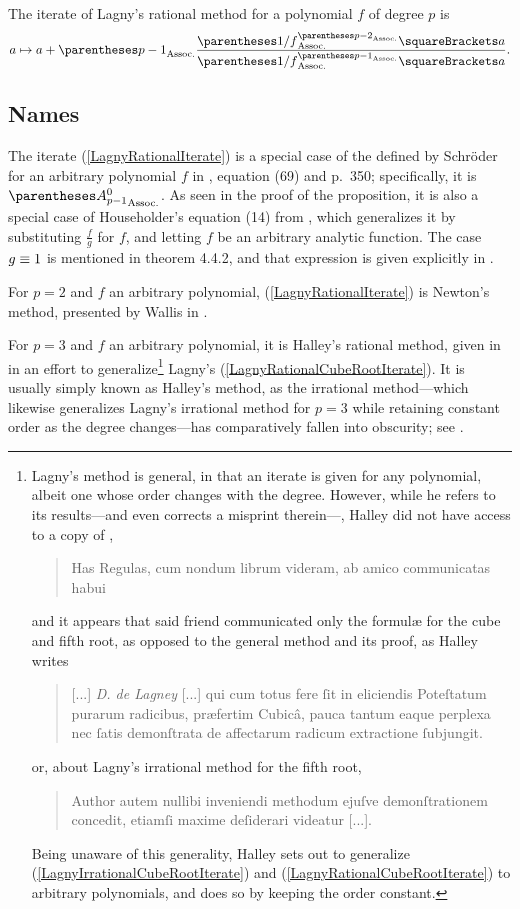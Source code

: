 ﻿\documentclass[10pt, a4paper, twoside]{basestyle}
\begin{document}
\begin{proposition}
The iterate of Lagny’s rational method for a polynomial $f$ of degree $p$ is\begin{equation}
a\mapsto a + \pa{p-1}\frac{\pa{1/f}^{\pa{p-2}}\of{a}}{\pa{1/f}^{\pa{p-1}}\of{a}}\text.\label{LagnyRationalIterate}
\end{equation}
\end{proposition}

\subsection*{Names}
The iterate (\ref{LagnyRationalIterate}) is a special case of the  defined by Schröder for an
arbitrary polynomial $f$ in \cite{Schröder1870}, equation (69) and p.~350; specifically, it is $\pa{A^0_{p-1}}$.
As seen in the proof of the proposition, it is also a special case of Householder’s  equation (14) from \cite[169]{Householder1970},
which generalizes it by substituting $\frac{f}{g}$ for $f$, and letting $f$ be an arbitrary analytic function. The case
$g\equiv1$ is mentioned in theorem 4.4.2, and that expression is given explicitly in \cite{SebahGourdon2001}.

For $p=2$ and $f$ an arbitrary polynomial, (\ref{LagnyRationalIterate}) is Newton's method, presented by Wallis in
\cite[338]{Wallis1685}.

For $p=3$ and $f$ an arbitrary polynomial, it is Halley's rational method, given in \cite[142--143]{Halley1694} in
an effort to generalize\footnote{Lagny's method is general, in that an iterate is given for any
polynomial, albeit one whose order changes with the degree. However, while he refers to its
results---and even corrects a misprint therein---, Halley
did not have access to a copy of \cite{FantetdeLagny1692},
\begin{quote}
Has Regulas, cum nondum librum videram, ab amico communicatas habui
\end{quote}
and it appears that said friend communicated only the formulæ for the cube and fifth root, as opposed to the
general method and its proof, as Halley writes
\begin{quote}
[...] \emph{D. de Lagney} [...] qui cum totus fere ſit in eliciendis Poteſtatum purarum radicibus,
præfertim Cubicâ, pauca tantum eaque perplexa nec ſatis demonſtrata de affectarum radicum
extractione ſubjungit.
\end{quote}
or, about Lagny's irrational method for the fifth root,
\begin{quote}
Author autem nullibi inveniendi methodum ejuſve demonſtrationem concedit,
etiamſi maxime deſiderari videatur [...].
\end{quote}
Being unaware of this generality, Halley sets out to generalize (\ref{LagnyIrrationalCubeRootIterate}) and (\ref{LagnyRationalCubeRootIterate}) to
arbitrary polynomials, and does so by keeping the order constant.} Lagny's (\ref{LagnyRationalCubeRootIterate}).
It is usually simply known as Halley's method, as the irrational method---which likewise generalizes Lagny's irrational
method for $p=3$ while retaining constant order as the degree changes---has comparatively fallen into obscurity;
see \cite{ScavoThoo1995}.
\end{document}

